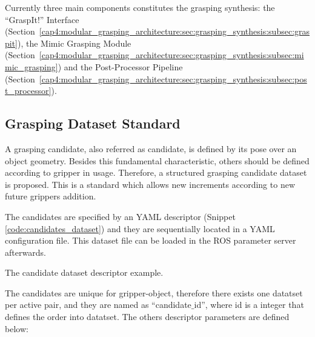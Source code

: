 Currently three main components constitutes the grasping synthesis: the ``GraspIt!'' Interface (Section~\ref{cap4:modular_grasping_architecture:sec:grasping_synthesis:subsec:graspit}), the Mimic Grasping Module (Section~\ref{cap4:modular_grasping_architecture:sec:grasping_synthesis:subsec:mimic_grasping}) and the Post-Processor Pipeline (Section~\ref{cap4:modular_grasping_architecture:sec:grasping_synthesis:subsec:post_processor}). 

\subsection{Grasping Dataset Standard}
\label{cap4:modular_grasping_architecture:sec:grasping_dataset}

A grasping candidate, also referred as candidate, is defined by its pose over an object geometry. Besides this fundamental characteristic, others should be defined according to gripper in usage. Therefore, a structured grasping candidate dataset is proposed. This is a standard which allows new increments according to new future grippers addition.

The candidates are specified by an YAML descriptor (Snippet \ref{code:candidates_dataset}) and they are sequentially located in a YAML configuration file. This dataset file can be loaded in the ROS parameter server afterwards. 

\begin{snippet}[h!]
	\centering
	\caption{The candidate dataset descriptor example.}
	\label{code:candidates_dataset}
\end{snippet}

The candidates are unique for gripper-object, therefore there exists one datatset per active pair, and they are named as ``candidate$\_$id'', where id is a integer that defines the order into datatset. The others descriptor parameters are defined below:

